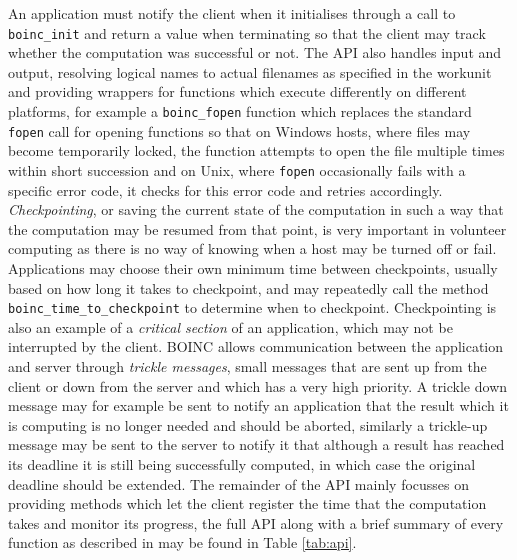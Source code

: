 An application must notify the client when it initialises through a call to \verb|boinc_init| and return a value when terminating so that the client may track whether the computation was successful or not. 
The API also handles input and output, resolving logical names to actual filenames as specified in the workunit and providing wrappers for functions which execute differently on different platforms, for example a \verb|boinc_fopen| function which replaces the standard \texttt{fopen} call for opening functions so that on Windows hosts, where files may become temporarily locked, the function attempts to open the file multiple times within short succession and on Unix, where \texttt{fopen} occasionally fails with a specific error code, it checks for this error code and retries accordingly. 
\emph{Checkpointing}, or saving the current state of the computation in such a way that the computation may be resumed from that point, is very important in volunteer computing as there is no way of knowing when a host may be turned off or fail. Applications may choose their own minimum time between checkpoints, usually based on how long it takes to checkpoint, and may repeatedly call the method \verb|boinc_time_to_checkpoint| to determine when to checkpoint. Checkpointing is also an example of a \emph{critical section} of an application,   which may not be interrupted by the client. 
BOINC  allows communication between the application and server through \emph{trickle messages}, small messages that are sent up from the client or down from the server and which has a very high priority. A trickle down message may for example be sent to notify an application that the result which it is computing is no longer needed and should be aborted, similarly a trickle-up message may be sent to the server to notify it that although a result  has reached its deadline it is still being successfully computed, in which case the original deadline should be extended.
The remainder of the API mainly focusses on providing methods which let the client register the time that the computation takes and monitor its progress, the full API along with a brief summary of every function as described in \cite{boincwiki, boincgit} may be found in Table \ref{tab:api}.


 

